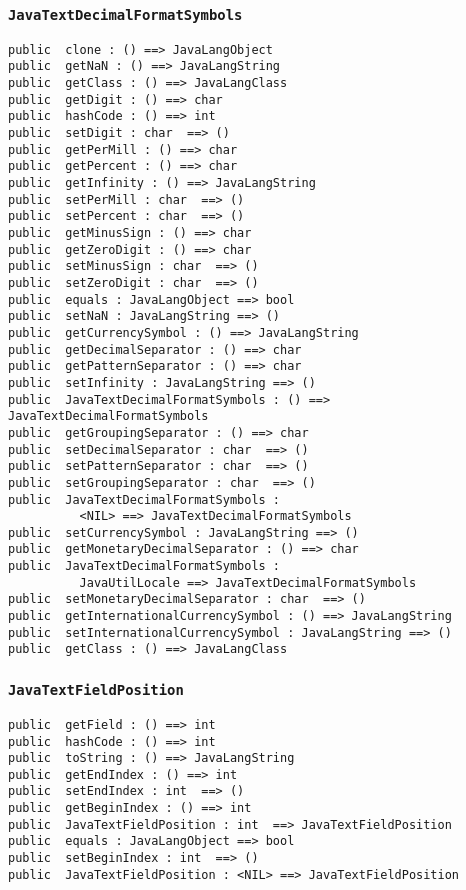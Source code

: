 \documentclass[\pformat,12pt]{article}
\begin{document}
\subsubsection{\texttt{JavaTextDecimalFormatSymbols}}
\begin{small}
\begin{verbatim}
public  clone : () ==> JavaLangObject
public  getNaN : () ==> JavaLangString
public  getClass : () ==> JavaLangClass
public  getDigit : () ==> char
public  hashCode : () ==> int
public  setDigit : char  ==> ()
public  getPerMill : () ==> char
public  getPercent : () ==> char
public  getInfinity : () ==> JavaLangString
public  setPerMill : char  ==> ()
public  setPercent : char  ==> ()
public  getMinusSign : () ==> char
public  getZeroDigit : () ==> char
public  setMinusSign : char  ==> ()
public  setZeroDigit : char  ==> ()
public  equals : JavaLangObject ==> bool
public  setNaN : JavaLangString ==> ()
public  getCurrencySymbol : () ==> JavaLangString
public  getDecimalSeparator : () ==> char
public  getPatternSeparator : () ==> char
public  setInfinity : JavaLangString ==> ()
public  JavaTextDecimalFormatSymbols : () ==> JavaTextDecimalFormatSymbols
public  getGroupingSeparator : () ==> char
public  setDecimalSeparator : char  ==> ()
public  setPatternSeparator : char  ==> ()
public  setGroupingSeparator : char  ==> ()
public  JavaTextDecimalFormatSymbols : 
          <NIL> ==> JavaTextDecimalFormatSymbols
public  setCurrencySymbol : JavaLangString ==> ()
public  getMonetaryDecimalSeparator : () ==> char
public  JavaTextDecimalFormatSymbols : 
          JavaUtilLocale ==> JavaTextDecimalFormatSymbols
public  setMonetaryDecimalSeparator : char  ==> ()
public  getInternationalCurrencySymbol : () ==> JavaLangString
public  setInternationalCurrencySymbol : JavaLangString ==> ()
public  getClass : () ==> JavaLangClass
\end{verbatim}
\end{small}

\subsubsection{\texttt{JavaTextFieldPosition}}
\begin{small}
\begin{verbatim}
public  getField : () ==> int
public  hashCode : () ==> int
public  toString : () ==> JavaLangString
public  getEndIndex : () ==> int
public  setEndIndex : int  ==> ()
public  getBeginIndex : () ==> int
public  JavaTextFieldPosition : int  ==> JavaTextFieldPosition
public  equals : JavaLangObject ==> bool
public  setBeginIndex : int  ==> ()
public  JavaTextFieldPosition : <NIL> ==> JavaTextFieldPosition
\end{verbatim}
\end{small}
\end{document}
